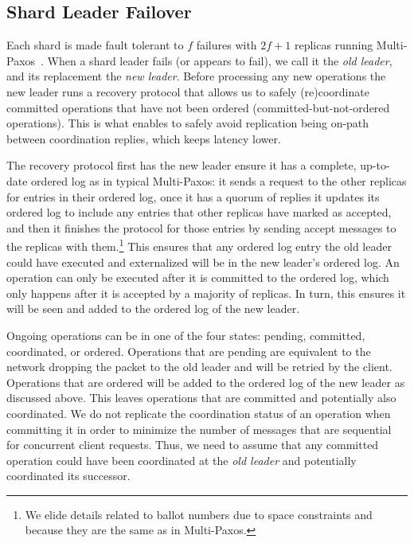 \subsection{Shard Leader Failover}
\label{subsec:leaderfailures}
Each shard is made fault tolerant to $f$ failures with $2f+1$ replicas running Multi-Paxos~\cite{lamport1998paxos}.
When a shard leader fails (or appears to fail), we call it the \textit{old leader}, and its replacement the \textit{new leader}.
Before processing any new operations the new leader runs a recovery protocol that allows us to safely (re)coordinate committed operations that have not been ordered (committed-but-not-ordered operations).
This is what enables \sys{} to safely avoid replication being on-path between coordination replies, which keeps latency lower.

The recovery protocol first has the new leader ensure it has a complete, up-to-date ordered log as in typical Multi-Paxos:
it sends a request to the other replicas for entries in their ordered log,
once it has a quorum of replies it updates its ordered log to include any entries that other replicas have marked as accepted,
and then it finishes the protocol for those entries by sending accept messages to the replicas with them.\footnote{We elide details related to ballot numbers due to space constraints and because they are the same as in Multi-Paxos.}
This ensures that any ordered log entry the old leader could have executed and externalized will be in the new leader's ordered log.
An operation can only be executed after it is committed to the ordered log,
which only happens after it is accepted by a majority of replicas. In turn, this
ensures it will be seen and added to the ordered log of the new leader.

Ongoing operations can be in one of the four states: pending, committed, coordinated, or ordered.
Operations that are pending are equivalent to the network dropping the packet to the old leader and will be retried by the client.
Operations that are ordered will be added to the ordered log of the new leader as discussed above.
This leaves operations that are committed and potentially also coordinated.
We do not replicate the coordination status of an operation when committing it in order to minimize the number of messages that are sequential for concurrent client requests.
Thus, we need to assume that any committed operation could have been coordinated at the \textit{old leader} and potentially coordinated its successor.

